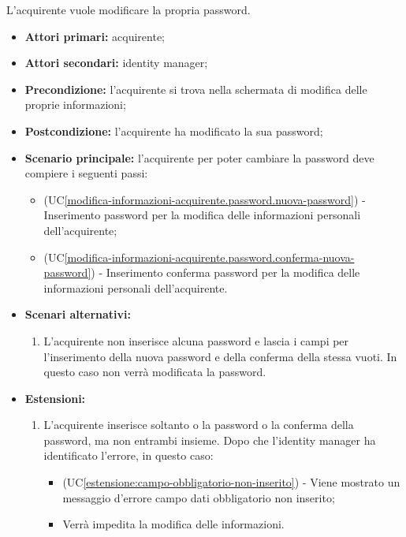 \label{modifica-informazioni-acquirente.password}

L'acquirente vuole modificare la propria password.
\begin{itemize}
    \item \textbf{Attori primari:} acquirente;
    \item \textbf{Attori secondari:} identity manager;
    \item \textbf{Precondizione:} l'acquirente si trova nella schermata di modifica delle proprie informazioni;
    \item \textbf{Postcondizione:} l'acquirente ha modificato la sua password;
    \item \textbf{Scenario principale:} l'acquirente per poter cambiare la password deve compiere i seguenti passi:
    \begin{itemize}
        \item (UC\ref{modifica-informazioni-acquirente.password.nuova-password}) - Inserimento password per la modifica delle informazioni personali dell'acquirente;
        \item (UC\ref{modifica-informazioni-acquirente.password.conferma-nuova-password}) - Inserimento conferma password per la modifica delle informazioni personali dell'acquirente.
    \end{itemize}
    \item \textbf{Scenari alternativi:}
    \begin{enumerate}[label=\lett]
    	\item L'acquirente non inserisce alcuna password e lascia i campi per l'inserimento della nuova password e della conferma della stessa vuoti. In questo caso non verrà modificata la password.
    \end{enumerate}
    \item \textbf{Estensioni:}
    \begin{enumerate}
        \item L'acquirente inserisce soltanto o la password o la conferma della password, ma non entrambi insieme. Dopo che l'identity manager ha identificato l'errore, in questo caso:
		\begin{itemize}
			\item (UC\ref{estensione:campo-obbligatorio-non-inserito}) - Viene mostrato un messaggio d'errore campo dati obbligatorio non inserito;
			\item Verrà impedita la modifica delle informazioni.
		\end{itemize}
    \end{enumerate}
\end{itemize}

